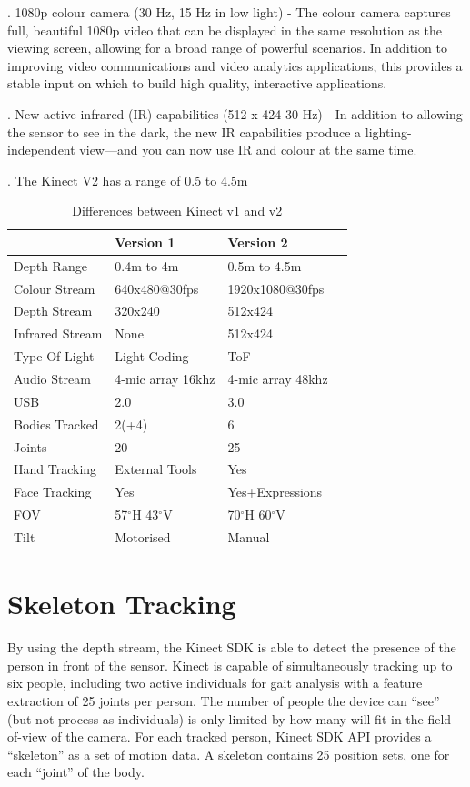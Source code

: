 . 1080p colour camera (30 Hz, 15 Hz in low light) - The colour camera captures full, beautiful 1080p video that can be displayed in the same resolution as the viewing screen, allowing for a broad range of powerful scenarios. In addition to improving video communications and video analytics applications, this provides a stable input on which to build high quality, interactive applications.

. New active infrared (IR) capabilities (512 x 424 30 Hz) - In addition to allowing the sensor to see in the dark, the new IR capabilities produce a lighting-independent view—and you can now use IR and colour at the same time.

. The Kinect V2 has a range of 0.5 to 4.5m

\def\arraystretch{1.5}
\begin{table}[h]
\centering
\begin{tabular}{ |p{4cm}||p{5cm}|p{5cm}|p{5cm}| }
 \hline
 \cellcolor{pink} & \cellcolor{pink} Version 1  &  \cellcolor{pink} Version 2 \\
 \hline
Depth Range  & 0.4m to 4m  & 0.5m to 4.5m  \\
Colour Stream & 640x480@30fps & 1920x1080@30fps \\
Depth Stream  & 320x240  & 512x424  \\
Infrared Stream & None & 512x424  \\
Type Of Light  & Light Coding  & ToF  \\
Audio Stream & 4-mic array 16khz & 4-mic array 48khz \\
USB  & 2.0  & 3.0  \\
Bodies Tracked  & 2(+4) & 6  \\
Joints & 20 & 25 \\
Hand Tracking & External Tools  & Yes  \\
Face Tracking  & Yes  & Yes+Expressions  \\
FOV & 57$^{\circ}$H 43$^{\circ}$V & 70$^{\circ}$H 60$^{\circ}$V \\
Tilt  & Motorised  & Manual  \\
\hline
\end{tabular}
\caption{Differences between Kinect v1 and v2}
\end{table}

\newpage





\section{Skeleton Tracking} \label{Skeleton Tracking} 
\noindent By using the depth stream, the Kinect SDK is able to detect the presence of the person in front of the sensor. Kinect is capable of simultaneously tracking up to six people, including two active individuals for gait analysis with a feature extraction of 25 joints per person. The number of people the device can “see” (but not process as individuals) is only limited by how many will fit in the field-of-view of the camera. For each tracked person, Kinect SDK API provides a “skeleton” as a set of motion data. A skeleton contains 25 position sets, one for each “joint” of the body.

